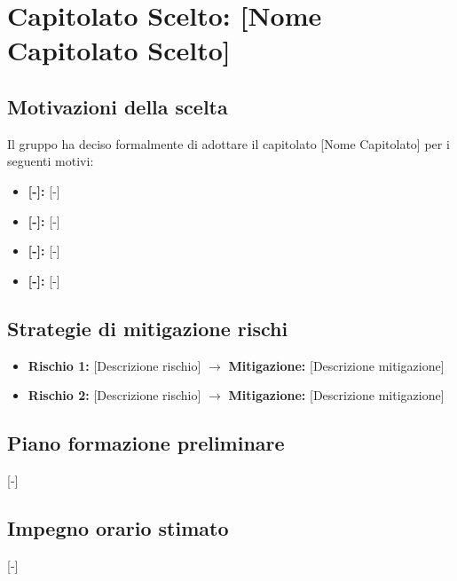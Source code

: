 \section{Capitolato Scelto: {[Nome Capitolato Scelto]}}

\subsection{Motivazioni della scelta}
Il gruppo ha deciso formalmente di adottare il capitolato {[Nome Capitolato]} per i seguenti motivi:
\begin{itemize}
	\item \textbf{[-]:} {[-]}
	\item \textbf{[-]:} {[-]}
	\item \textbf{[-]:} {[-]}
	\item \textbf{[-]:} {[-]}
\end{itemize}

\subsection{Strategie di mitigazione rischi}
\begin{itemize}
	\item \textbf{Rischio 1:} {[Descrizione rischio]} $\rightarrow$ \textbf{Mitigazione:} {[Descrizione mitigazione]}
	\item \textbf{Rischio 2:} {[Descrizione rischio]} $\rightarrow$ \textbf{Mitigazione:} {[Descrizione mitigazione]}
\end{itemize}

\subsection{Piano formazione preliminare}
{[-]}

\subsection{Impegno orario stimato}
{[-]}